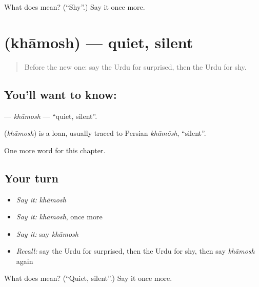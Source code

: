 \begin{tcolorbox}[breakable,colback=teal!4,colframe=teal!35!black,title={Before you move on}]
What does  mean? (\textquotedblleft{}Shy\textquotedblright{}.) Say it once more.
\end{tcolorbox}
\section[\texorpdfstring{\ur{خاموش} (khāmosh)}{خاموش (khāmosh)}]{ (khāmosh) — quiet, silent}

\label{lesson:UR-C221-khamosh}



\begin{quote}
Before the new one: say the Urdu for surprised, then the Urdu for shy.
\end{quote}

\subsection*{You'll want to know: }
\textbf{} — \emph{khāmosh} — \textquotedblleft{}quiet, silent\textquotedblright{}.

\begin{cousinweb}
\textbf{} (\emph{khāmosh}) is a loan, usually traced to Persian \emph{khāmōsh}, \textquotedblleft{}silent\textquotedblright{}.
\end{cousinweb}

\begin{grammarlens}[title={What you've built}]
One more word for this chapter.
\end{grammarlens}

\subsection*{Your turn}
\begin{itemize}
\raggedright
  \item \emph{Say it:} \emph{khāmosh}
  \item \emph{Say it:} \emph{khāmosh}, once more
  \item \emph{Say it:} say \emph{khāmosh}
  \item \emph{Recall:} say the Urdu for surprised, then the Urdu for shy, then say \emph{khāmosh} again
\end{itemize}

\begin{tcolorbox}[breakable,colback=teal!4,colframe=teal!35!black,title={Before you move on}]
What does  mean? (\textquotedblleft{}Quiet, silent\textquotedblright{}.) Say it once more.
\end{tcolorbox}
